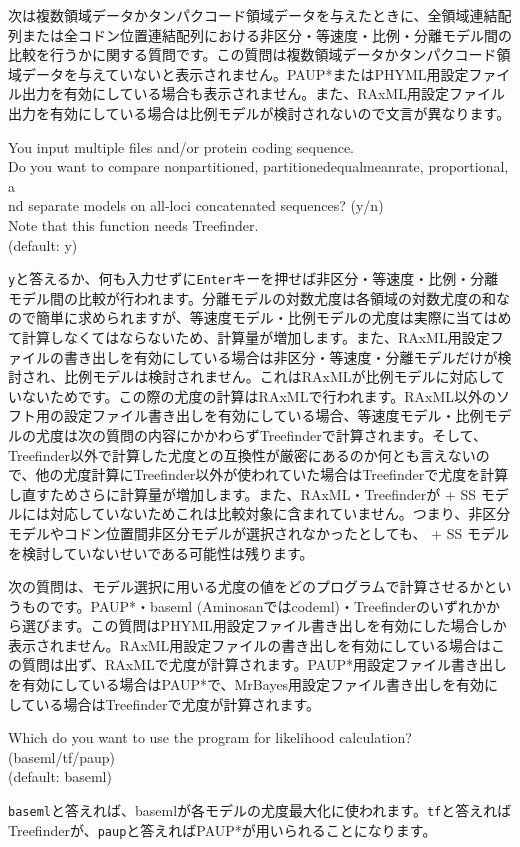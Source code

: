 \documentclass[titlepage,10pt,a4paper]{jsbook}
\newenvironment{cmd}{\begin{oframed}\raggedright\ttfamily\footnotesize\setlength{\baselineskip}{1.4em}}{\end{oframed}\vspace{-1em}}
\begin{document}
次は複数領域データかタンパクコード領域データを与えたときに、全領域連結配列または全コドン位置連結配列における非区分・等速度・比例・分離モデル間の比較を行うかに関する質問です。この質問は複数領域データかタンパクコード領域データを与えていないと表示されません。PAUP*またはPHYML用設定ファイル出力を有効にしている場合も表示されません。また、RAxML用設定ファイル出力を有効にしている場合は比例モデルが検討されないので文言が異なります。
\begin{cmd}
You input multiple files and/or protein coding sequence.\\
Do you want to compare nonpartitioned, partitionedequalmeanrate, proportional, a\\
nd separate models on all-loci concatenated sequences? (y/n)\\
Note that this function needs Treefinder.\\
(default: y)
\end{cmd}
\texttt{y}と答えるか、何も入力せずに\texttt{Enter}キーを押せば非区分・等速度・比例・分離モデル間の比較が行われます。分離モデルの対数尤度は各領域の対数尤度の和なので簡単に求められますが、等速度モデル・比例モデルの尤度は実際に当てはめて計算しなくてはならないため、計算量が増加します。また、RAxML用設定ファイルの書き出しを有効にしている場合は非区分・等速度・分離モデルだけが検討され、比例モデルは検討されません。これはRAxMLが比例モデルに対応していないためです。この際の尤度の計算はRAxMLで行われます。RAxML以外のソフト用の設定ファイル書き出しを有効にしている場合、等速度モデル・比例モデルの尤度は次の質問の内容にかかわらずTreefinderで計算されます。そして、Treefinder以外で計算した尤度との互換性が厳密にあるのか何とも言えないので、他の尤度計算にTreefinder以外が使われていた場合はTreefinderで尤度を計算し直すためさらに計算量が増加します。また、RAxML・Treefinderが + SS モデルには対応していないためこれは比較対象に含まれていません。つまり、非区分モデルやコドン位置間非区分モデルが選択されなかったとしても、 + SS モデルを検討していないせいである可能性は残ります。

次の質問は、モデル選択に用いる尤度の値をどのプログラムで計算させるかというものです。PAUP*・baseml (Aminosanではcodeml)・Treefinderのいずれかから選びます。この質問はPHYML用設定ファイル書き出しを有効にした場合しか表示されません。RAxML用設定ファイルの書き出しを有効にしている場合はこの質問は出ず、RAxMLで尤度が計算されます。PAUP*用設定ファイル書き出しを有効にしている場合はPAUP*で、MrBayes用設定ファイル書き出しを有効にしている場合はTreefinderで尤度が計算されます。
\begin{cmd}
Which do you want to use the program for likelihood calculation? (baseml/tf/paup)\\
(default: baseml)
\end{cmd}
\texttt{baseml}と答えれば、basemlが各モデルの尤度最大化に使われます。\texttt{tf}と答えればTreefinderが、\texttt{paup}と答えればPAUP*が用いられることになります。
\end{document}
